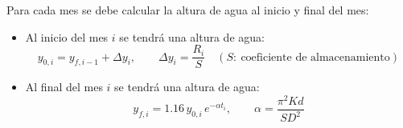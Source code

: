 Para cada mes se debe calcular la altura de agua al inicio y final del mes:
\begin{itemize}
  \item Al inicio del mes $i$ se tendrá una altura de agua:
  \[
  y_{0,i}=y_{f,i-1}+\Delta y_i,\qquad\Delta y_i=\frac{R_i}{S}\quad(S:\ \text{coeficiente de almacenamiento})
  \]
  \item Al final del mes $i$ se tendrá una altura de agua:
  \[
  y_{f,i}=1.16\,y_{0,i}\,e^{-\alpha t_i},\qquad\alpha=\frac{\pi^2Kd}{SD^2}
  \]
\end{itemize}
